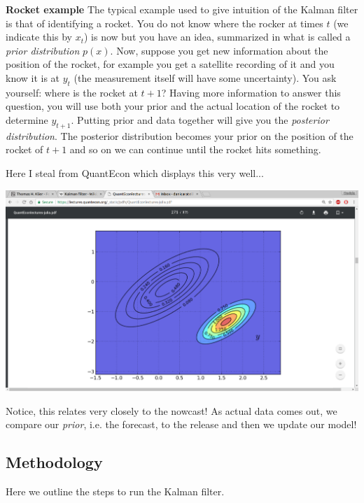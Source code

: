 \documentclass[11pt]{article}
\theoremstyle{definition}
\begin{document}
\begin{shaded}
  \textbf{Rocket example}\newline
  The typical example used to give intuition of the Kalman filter is that of identifying a rocket. You do not know where the rocker at times $t$ (we indicate this by $x_{t}$) is now but you have an idea, summarized in what is called a \textit{prior distribution} $p(x)$. Now, suppose you get new information about the position of the rocket, for example you get a satellite recording of it and you know it is at $y_{t}$ (the measurement itself will have some uncertainty). You ask yourself: where is the rocket at $t+1$? Having more information to answer this question, you will use both your prior and the actual location of the rocket to determine $y_{t+1}$. Putting prior and data together will give you the \textit{posterior distribution}. The posterior distribution becomes your prior on the position of the rocket of $t+1$ and so on we can continue until the rocket hits something.

 Here I steal from QuantEcon which displays this very well...
\begin{center}
 \includegraphics[scale=0.25,trim={12cm, 2cm, 12cm, 6.8cm}, clip]{plots/kalman.png}
\end{center} 
  


Notice, this relates very closely to the nowcast! As actual data comes out, we compare our \textit{prior}, i.e. the forecast, to the release and then we update our model!
\end{shaded}


\subsection{Methodology}
Here we outline the steps to run the Kalman filter.
\end{document}
